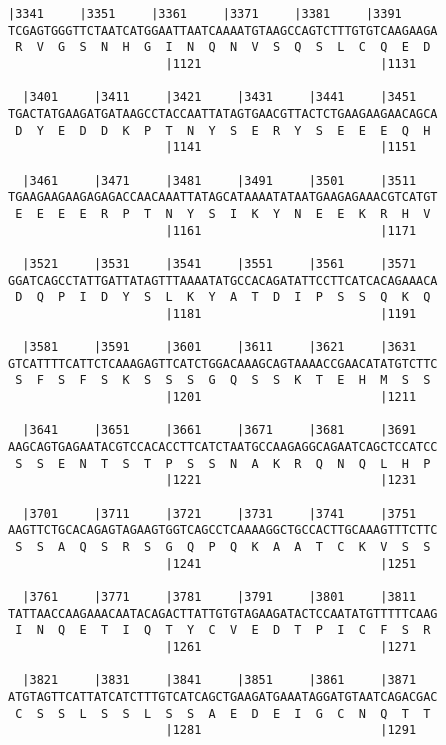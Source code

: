 \documentclass{article}
\begin{document}
\newpage
\begin{Verbatim}[fontfamily=courier]
  |3341     |3351     |3361     |3371     |3381     |3391   
TCGAGTGGGTTCTAATCATGGAATTAATCAAAATGTAAGCCAGTCTTTGTGTCAAGAAGA
 R  V  G  S  N  H  G  I  N  Q  N  V  S  Q  S  L  C  Q  E  D 
                      |1121                         |1131   

  |3401     |3411     |3421     |3431     |3441     |3451   
TGACTATGAAGATGATAAGCCTACCAATTATAGTGAACGTTACTCTGAAGAAGAACAGCA
 D  Y  E  D  D  K  P  T  N  Y  S  E  R  Y  S  E  E  E  Q  H 
                      |1141                         |1151   

  |3461     |3471     |3481     |3491     |3501     |3511   
TGAAGAAGAAGAGAGACCAACAAATTATAGCATAAAATATAATGAAGAGAAACGTCATGT
 E  E  E  E  R  P  T  N  Y  S  I  K  Y  N  E  E  K  R  H  V 
                      |1161                         |1171   

  |3521     |3531     |3541     |3551     |3561     |3571   
GGATCAGCCTATTGATTATAGTTTAAAATATGCCACAGATATTCCTTCATCACAGAAACA
 D  Q  P  I  D  Y  S  L  K  Y  A  T  D  I  P  S  S  Q  K  Q 
                      |1181                         |1191   

  |3581     |3591     |3601     |3611     |3621     |3631   
GTCATTTTCATTCTCAAAGAGTTCATCTGGACAAAGCAGTAAAACCGAACATATGTCTTC
 S  F  S  F  S  K  S  S  S  G  Q  S  S  K  T  E  H  M  S  S 
                      |1201                         |1211   

  |3641     |3651     |3661     |3671     |3681     |3691   
AAGCAGTGAGAATACGTCCACACCTTCATCTAATGCCAAGAGGCAGAATCAGCTCCATCC
 S  S  E  N  T  S  T  P  S  S  N  A  K  R  Q  N  Q  L  H  P 
                      |1221                         |1231   

  |3701     |3711     |3721     |3731     |3741     |3751   
AAGTTCTGCACAGAGTAGAAGTGGTCAGCCTCAAAAGGCTGCCACTTGCAAAGTTTCTTC
 S  S  A  Q  S  R  S  G  Q  P  Q  K  A  A  T  C  K  V  S  S 
                      |1241                         |1251   

  |3761     |3771     |3781     |3791     |3801     |3811   
TATTAACCAAGAAACAATACAGACTTATTGTGTAGAAGATACTCCAATATGTTTTTCAAG
 I  N  Q  E  T  I  Q  T  Y  C  V  E  D  T  P  I  C  F  S  R 
                      |1261                         |1271   

  |3821     |3831     |3841     |3851     |3861     |3871   
ATGTAGTTCATTATCATCTTTGTCATCAGCTGAAGATGAAATAGGATGTAATCAGACGAC
 C  S  S  L  S  S  L  S  S  A  E  D  E  I  G  C  N  Q  T  T 
                      |1281                         |1291   

\end{Verbatim}
\end{document}
